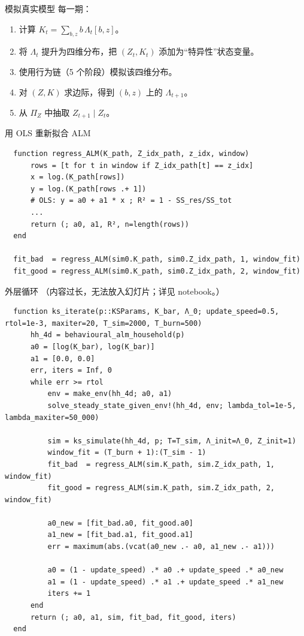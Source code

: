 \documentclass[10pt,aspectratio=169]{beamer}
\begin{document}
\begin{frame}{模拟真实模型}
  每一期：
  \begin{enumerate}
    \item 计算 $K_t = \sum_{b, z} b\, \Lambda_t[b, z]$。
    \item 将 $\Lambda_t$ 提升为四维分布，把 $(Z_t, K_t)$ 添加为``特异性''状态变量。
    \item 使用行为链（5 个阶段）模拟该四维分布。
    \item 对 $(Z, K)$ 求边际，得到 $(b, z)$ 上的 $\Lambda_{t+1}$。
    \item 从 $\Pi_Z$ 中抽取 $Z_{t+1} \mid Z_t$。
  \end{enumerate}
\end{frame}

\begin{frame}[fragile]{用 OLS 重新拟合 ALM}
  \begin{lstlisting}
  function regress_ALM(K_path, Z_idx_path, z_idx, window)
      rows = [t for t in window if Z_idx_path[t] == z_idx]
      x = log.(K_path[rows])
      y = log.(K_path[rows .+ 1])
      # OLS: y = a0 + a1 * x ; R² = 1 - SS_res/SS_tot
      ...
      return (; a0, a1, R², n=length(rows))
  end

  fit_bad  = regress_ALM(sim0.K_path, sim0.Z_idx_path, 1, window_fit)
  fit_good = regress_ALM(sim0.K_path, sim0.Z_idx_path, 2, window_fit)
  \end{lstlisting}
\end{frame}

\begin{frame}[fragile]{外层循环}
  （内容过长，无法放入幻灯片；详见 notebook。）
  
  \begin{lstlisting}
  function ks_iterate(p::KSParams, K_bar, Λ_0; update_speed=0.5, rtol=1e-3, maxiter=20, T_sim=2000, T_burn=500)
      hh_4d = behavioural_alm_household(p)
      a0 = [log(K_bar), log(K_bar)]
      a1 = [0.0, 0.0]
      err, iters = Inf, 0
      while err >= rtol
          env = make_env(hh_4d; a0, a1)
          solve_steady_state_given_env!(hh_4d, env; lambda_tol=1e-5, lambda_maxiter=50_000)

          sim = ks_simulate(hh_4d, p; T=T_sim, Λ_init=Λ_0, Z_init=1)
          window_fit = (T_burn + 1):(T_sim - 1)
          fit_bad  = regress_ALM(sim.K_path, sim.Z_idx_path, 1, window_fit)
          fit_good = regress_ALM(sim.K_path, sim.Z_idx_path, 2, window_fit)

          a0_new = [fit_bad.a0, fit_good.a0]
          a1_new = [fit_bad.a1, fit_good.a1]
          err = maximum(abs.(vcat(a0_new .- a0, a1_new .- a1)))

          a0 = (1 - update_speed) .* a0 .+ update_speed .* a0_new
          a1 = (1 - update_speed) .* a1 .+ update_speed .* a1_new
          iters += 1
      end
      return (; a0, a1, sim, fit_bad, fit_good, iters)
  end
  \end{lstlisting}
\end{frame}
\end{document}
